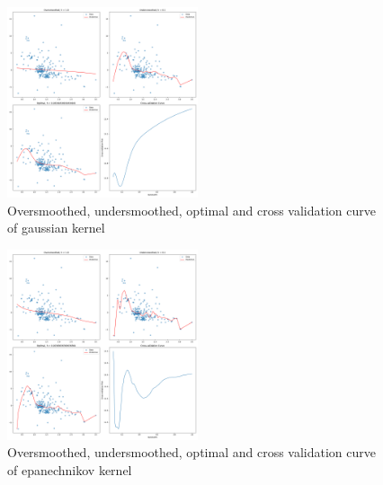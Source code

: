 \begin{figure}[H]
	\centering
	\includegraphics[width=0.5\textwidth]{../images/4/gaussian_kernel_regression.png}
	\caption{Oversmoothed, undersmoothed, optimal and cross validation curve of gaussian kernel}
\end{figure}

\begin{figure}[H]
	\centering
	\includegraphics[width=0.5\textwidth]{../images/4/epanechnikov_kernel_regression.png}
	\caption{Oversmoothed, undersmoothed, optimal and cross validation curve of epanechnikov kernel}
\end{figure}

